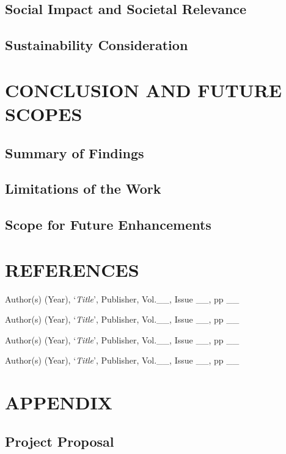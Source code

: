 \documentclass[12pt,a4paper]{report}
\begin{document}
\section{Social Impact and Societal Relevance}
\section{Sustainability Consideration}


\chapter{CONCLUSION AND FUTURE SCOPES}
\section{Summary of Findings}
\section{Limitations of the Work}
\section{Scope for Future Enhancements}


\chapter*{REFERENCES}

\begin{enumerate}[label={[{\arabic*}]}]
	\item{} Author(s) (Year), `\textit{Title}', Publisher, Vol.\_\_, Issue \_\_, pp \_\_
    \item{} Author(s) (Year), `\textit{Title}', Publisher, Vol.\_\_, Issue \_\_, pp \_\_
    \item{} Author(s) (Year), `\textit{Title}', Publisher, Vol.\_\_, Issue \_\_, pp \_\_
    \item{} Author(s) (Year), `\textit{Title}', Publisher, Vol.\_\_, Issue \_\_, pp \_\_
\end{enumerate}
	

\chapter*{APPENDIX}


\section*{Project Proposal}
\end{document}

